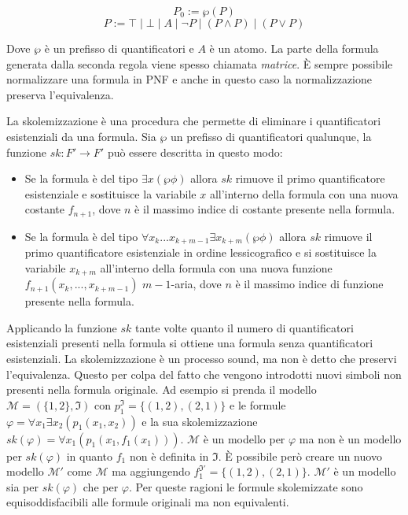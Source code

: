 \documentclass[./main.tex]{subfiles}
\begin{document}
$$ P_0 := \wp(P) $$
$$ P := \top \mid \bot \mid A \mid \lnot P \mid (P \land P) \mid (P \lor P) $$

Dove $\wp$ è un prefisso di quantificatori e $A$ è un atomo.
La parte della formula generata dalla seconda regola viene spesso chiamata \textit{matrice}.
È sempre possibile normalizzare una formula in PNF e anche in questo caso la normalizzazione preserva l'equivalenza.


La skolemizzazione è una procedura che permette di eliminare i quantificatori esistenziali da una formula. 
Sia $\wp$ un prefisso di quantificatori qualunque, la funzione $sk : F' \rightarrow F'$ può essere descritta in questo modo:

\begin{itemize}
  \item Se la formula è del tipo $\exists x(\wp \phi)$ allora $sk$ rimuove il primo quantificatore esistenziale e sostituisce 
  la variabile $x$ all'interno della formula con una nuova costante $f_{n+1}$, dove $n$ è il massimo indice di costante presente nella formula.

  \item Se la formula è del tipo $\forall x_k ... x_{k+m-1} \exists x_{k+m} (\wp \phi)$ allora $sk$ rimuove 
  il primo quantificatore esistenziale in ordine lessicografico e si sostituisce la variabile $x_{k+m}$ all'interno della formula con una nuova funzione 
  $f_{n+1}(x_k, ... , x_{k+m-1})$
  $m-1$-aria, dove $n$ è il massimo indice di funzione presente nella formula.
\end{itemize}

Applicando la funzione $sk$ tante volte quanto il numero di quantificatori esistenziali presenti nella formula si ottiene una formula 
senza quantificatori esistenziali. La skolemizzazione è un processo sound, ma non è detto che preservi l'equivalenza.
Questo per colpa del fatto che vengono introdotti nuovi simboli non presenti nella formula originale.
Ad esempio si prenda il modello $\mathcal{M} = (\{1, 2\}, \mathfrak{I})$ con $p_1^\mathfrak{I} = \{(1, 2), (2, 1)\}$ e le formule
$\varphi = \forall x_1 \exists x_2 (p_1(x_1, x_2))$ e la sua skolemizzazione $sk(\varphi) = \forall x_1 (p_1(x_1, f_1(x_1)))$.
$\mathcal{M}$ è un modello per $\varphi$ ma non è un modello per $sk(\varphi)$ in quanto $f_1$ non è definita in $\mathfrak{I}$.
È possibile però creare un nuovo modello $\mathcal{M}'$ come $\mathcal{M}$ ma aggiungendo $f_1^{\mathfrak{I}'} = \{(1, 2), (2, 1)\}$.
$\mathcal{M}'$ è un modello sia per $sk(\varphi)$ che per $\varphi$. 
Per queste ragioni le formule skolemizzate sono equisoddisfacibili alle formule originali ma non equivalenti.
\end{document}
